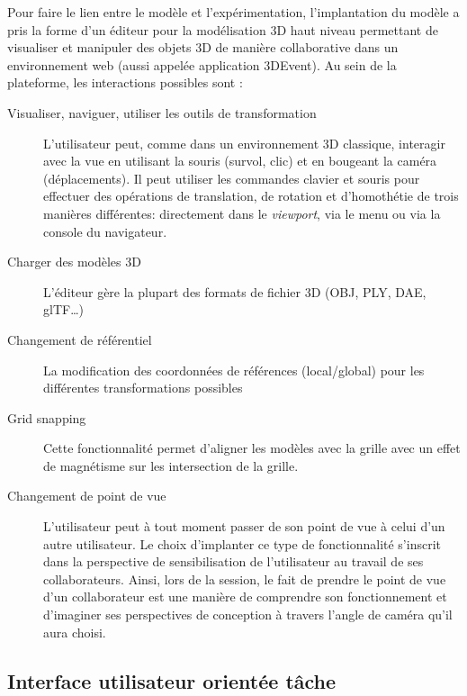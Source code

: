 Pour faire le lien entre le modèle et l'expérimentation, l'implantation du modèle a 
pris la forme d'un éditeur pour la modélisation \gls{3D} haut niveau permettant de 
visualiser et manipuler des objets \gls{3D} de manière collaborative dans un 
environnement web (aussi 
appelée \og application 3DEvent\fg{}). Au sein de la plateforme, les interactions 
possibles sont : 
\begin{description}
	
	\item[Visualiser, naviguer, utiliser les outils de transformation] L'utilisateur peut, 
	com\-me dans un environnement \gls{3D} classique, interagir avec la vue en 
	utilisant 
	la souris (survol, clic) et en bougeant la caméra (déplacements). Il peut 
	utiliser les commandes clavier et souris pour effectuer des opérations de 
	translation, de rotation et d'homothétie de trois manières différentes: directement dans le \textit{viewport}, via le 
	menu ou via la console du navigateur.
	\item[Charger des modèles \gls{3D}] L'éditeur gère la plupart des formats de 
	fichier 
	3D (OBJ, PLY, DAE, glTF\ldots)
	\item[Changement de référentiel] La modification des coordonnées de 
	réfé\-ren\-ces (local/global)  pour les différentes transformations possibles
	\item[Grid snapping] Cette fonctionnalité permet d'aligner les modèles avec la 
	grille avec un effet de magnétisme sur les intersection de la grille.
	\item[Changement de point de vue] L'utilisateur peut à tout moment passer de 
	son point de vue à celui d'un autre utilisateur. Le choix d'implanter ce type de 
	fonctionnalité s'inscrit dans la perspective de sensibilisation de l'utilisateur au 
	travail de ses collaborateurs. Ainsi, lors de la session, le fait de prendre le 
	point de vue d'un collaborateur est une manière de 
	comprendre son fonctionnement et d'imaginer ses 
	perspectives de conception à travers l'angle de caméra qu'il aura choisi.
\end{description}



\subsection{Interface utilisateur orientée tâche}

